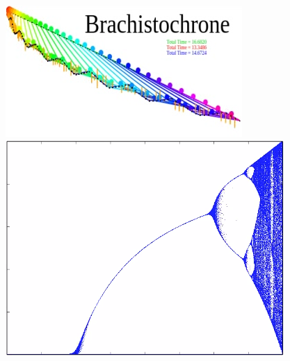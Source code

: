 \documentclass[../resume.tex]{subfiles}
\begin{document}
\noindent
\href{https://twitter.com/randompast/status/897526013437018114}{\includegraphics[scale=0.6]{../scientific/brachistochrone.png}}
\href{https://twitter.com/randompast/status/984569577697882112}{\includegraphics[scale=0.35]{../scientific/logistic.png}}
\end{document}

